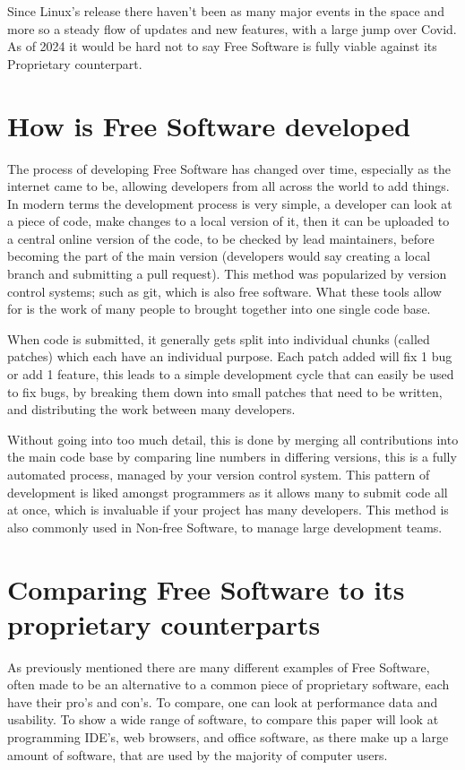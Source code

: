 \documentclass[a4paper,12pt]{article}
\begin{document}
{Since Linux's release there haven't been as many major events in the space and more so a steady flow
of updates and new features, with a large jump over Covid. As of 2024 it would be hard not to 
say Free Software is fully viable against its Proprietary counterpart.

\section{How is Free Software developed}
The process of developing Free Software has changed over time, especially as the internet came to be,
allowing developers from all across the world to add things. In modern terms the development process is 
very simple, a developer can look at a piece of code, make changes to a local version of it, then it 
can be uploaded to a central online version of the code, to be checked by lead maintainers, before becoming
the part of the main version (developers would say creating a local branch and submitting a pull request). 
This method was popularized by version control systems; such as git\cite{GIT}, which is also free software. 
What these tools allow for is the work of many people to brought together into one single code base.

When code is submitted, it generally gets split into individual chunks (called patches) which each
have an individual purpose. Each patch added will fix 1 bug or add 1 feature, this leads to a simple
development cycle that can easily be used to fix bugs, by breaking them down into small patches that
need to be written, and distributing the work between many developers. 

Without going into too much detail, this is done by merging all contributions into the main code base
by comparing line numbers in differing versions, this is a fully automated process, managed by your
version control system. This pattern of development is liked amongst programmers as it allows many 
to submit code all at once, which is invaluable if your project has many developers. This method
is also commonly used in Non-free Software, to manage large development teams\cite{NONFREEvcs}.

\section{Comparing Free Software to its proprietary counterparts}
As previously mentioned there are many different examples of Free Software, often made to be an 
alternative to a common piece of proprietary software, each have their pro's and con's. To compare,
one can look at performance data and usability. To show a wide range of software, to compare this paper 
will look at programming IDE's, web browsers, and office software, as there make up a large amount 
of software, that are used by the majority of computer users.

}
\end{document}
